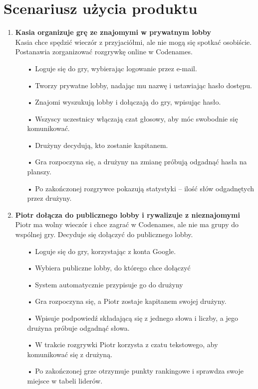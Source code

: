 \documentclass[12pt,a4paper,colorlinks=true,linkcolor=NavyBlue,citecolor=red,urlcolor=NavyBlue]{book}
\begin{document}
\section{Scenariusz użycia produktu}
\begin{enumerate}
    \item \textbf{Kasia organizuje grę ze znajomymi w prywatnym lobby}  \\[2mm] 
    Kasia chce spędzić wieczór z przyjaciółmi, ale nie mogą się spotkać osobiście. Postanawia zorganizować rozgrywkę online w Codenames.
    \begin{itemize}
        \item[•] Loguje się do gry, wybierając logowanie przez e-mail.
        \item[•] Tworzy prywatne lobby, nadając mu nazwę i ustawiając hasło dostępu.
        \item[•] Znajomi wyszukują lobby i dołączają do gry, wpisując hasło.
        \item[•] Wszyscy uczestnicy włączają czat głosowy, aby móc swobodnie się komunikować.
        \item[•] Drużyny decydują, kto zostanie kapitanem.
        \item[•] Gra rozpoczyna się, a drużyny na zmianę próbują odgadnąć hasła na planszy.
        \item[•] Po zakończonej rozgrywce pokazują statystyki – ilość słów odgadnętych przez drużyny.
    \end{itemize}
    \item \textbf{Piotr dołącza do publicznego lobby i rywalizuje z nieznajomymi}   \\[2mm] 
    Piotr ma wolny wieczór i chce zagrać w Codenames, ale nie ma grupy do wspólnej gry. Decyduje się dołączyć do publicznego lobby.
    \begin{itemize}
        \item[•] Loguje się do gry, korzystając z konta Google.
        \item[•] Wybiera publiczne lobby, do którego chce dołączyć
        \item[•] System automatycznie przypisuje go do drużyny 
        \item[•] Gra rozpoczyna się, a Piotr zostaje kapitanem swojej drużyny.
        \item[•] Wpisuje podpowiedź składającą się z jednego słowa i liczby, a jego drużyna próbuje odgadnąć słowa.
        \item[•] W trakcie rozgrywki Piotr korzysta z czatu tekstowego, aby komunikować się z drużyną.
        \item[•] Po zakończonej grze otrzymuje punkty rankingowe i sprawdza swoje miejsce w tabeli liderów.
    \end{itemize}
\end{enumerate}
\end{document}
